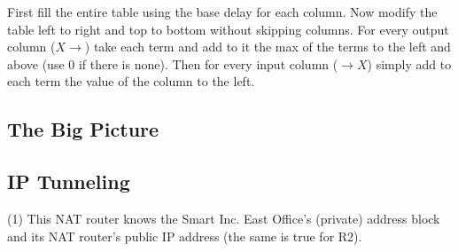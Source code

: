 First fill the entire table using the base delay for each column. Now
modify the table left to right and top to bottom without skipping
columns. For every output column ($X\to$) take each term and add to it
the max of the terms to the left and above (use 0 if there is none). Then
for every input column ($\to X$) simply add to each term the value of
the column to the left.
\subsection{The Big Picture}
\begin{center}
\end{center}
\subsection{IP Tunneling}
\begin{center}
\end{center}
(1) This NAT router knows the Smart Inc. East Office’s (private) address
block and its NAT router’s public IP address (the same is true for R2).


